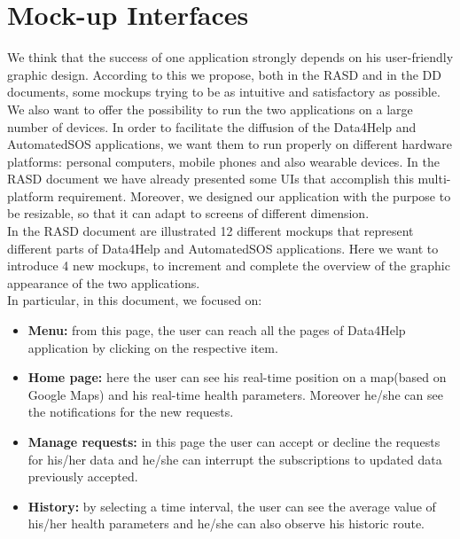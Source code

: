 \hypertarget{MK}{\section{Mock-up Interfaces}}
We think that the success of one application strongly depends on his user-friendly graphic design. According to this we propose, both in the RASD and in the DD documents, some mockups trying to be as intuitive and satisfactory as possible.\\
We also want to offer the possibility to run the two applications on a large number of devices. 
In order to facilitate the diffusion of the Data4Help and AutomatedSOS applications, we want them to run properly on different hardware platforms: personal computers, mobile phones and also wearable devices. In the RASD document we have already presented some UIs that accomplish this multi-platform requirement.
Moreover, we designed our application with the purpose to be resizable, so that it can adapt to screens of different dimension.\\
In the RASD document are illustrated 12 different mockups that represent different parts of Data4Help and AutomatedSOS applications. Here we want to introduce 4 new mockups, to increment and complete the overview of the graphic appearance of the two applications. \\
In particular, in this document, we focused on:
\begin{itemize}
    \item \textbf{Menu:}
    from this page, the user can reach all the pages of Data4Help application by clicking on the respective item.
    \item \textbf{Home page:}
    here the user can see his real-time position on a map(based on Google Maps) and his real-time health parameters.
    Moreover he/she can see the notifications for the new requests.
    \item \textbf{Manage requests:}
    in this page the user can accept or decline the requests for his/her data and he/she can interrupt the subscriptions to updated data previously accepted.
    \item \textbf{History:}
    by selecting a time interval, the user can see the average value of his/her health parameters and he/she can also observe his historic route.
\end{itemize}
\clearpage

